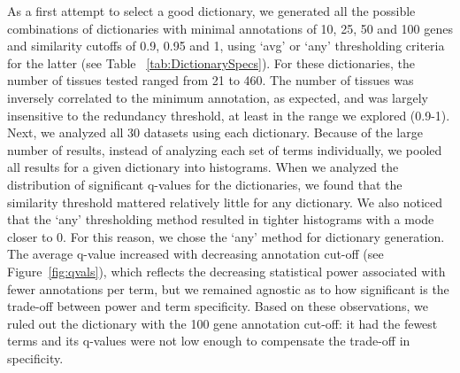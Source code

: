 \documentclass{bmcart}
\begin{document}
	As a first attempt to select a good dictionary, we generated all the possible combinations of dictionaries with minimal annotations of 10, 25, 50 and 100 genes and similarity cutoffs of 0.9, 0.95 and 1, using `avg' or `any' thresholding criteria for the latter (see Table ~\ref{tab:DictionarySpecs}). For these dictionaries, the number of tissues tested ranged from 21 to 460. The number of tissues was inversely correlated to the minimum annotation, as expected, and was largely insensitive to the redundancy threshold, at least in the range we explored (0.9-1). Next, we analyzed all 30 datasets using each dictionary. Because of the large number of results, instead of analyzing each set of terms individually, we pooled all results for a given dictionary into histograms. When we analyzed the distribution of significant q-values for the dictionaries, we found that the similarity threshold mattered relatively little for any dictionary. We also noticed that the `any' thresholding method resulted in tighter histograms with a mode closer to 0. For this reason, we chose the `any' method for dictionary generation. The average q-value increased with decreasing annotation cut-off (see Figure~\ref{fig:qvals}), which reflects the decreasing statistical power associated with fewer annotations per term, but we remained agnostic as to how significant is the trade-off between power and term specificity. Based on these observations, we ruled out the dictionary with the 100 gene annotation cut-off: it had the fewest terms and its q-values were not low enough to compensate the trade-off in specificity.
\end{document}
